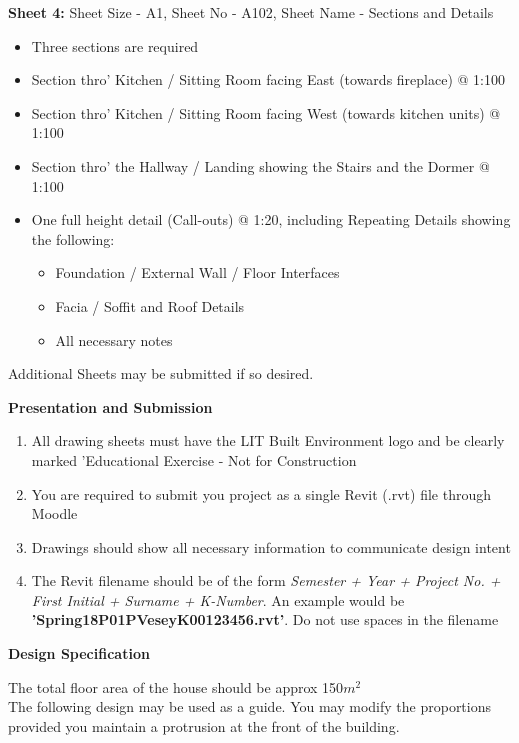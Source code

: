 \textbf{Sheet 4:} Sheet Size - A1, Sheet No - A102, Sheet Name - Sections and Details
\begin{itemize}
	\item Three sections are required
	\item Section thro' Kitchen / Sitting Room facing East (towards fireplace) @ 1:100
	\item Section thro' Kitchen / Sitting Room facing West (towards kitchen units) @ 1:100
	\item Section thro' the Hallway / Landing showing the Stairs and the Dormer @ 1:100
	\item One full height detail (Call-outs) @ 1:20, including Repeating Details showing the following:
	\begin{itemize}
		\item Foundation / External Wall / Floor Interfaces
		\item Facia / Soffit and Roof Details
		\item All necessary notes
	\end{itemize} 
\end{itemize}

Additional Sheets may be submitted if so desired.

\large\textbf{Presentation and Submission}\\
\begin{enumerate}
	\item All drawing sheets must have the LIT Built Environment logo and be clearly marked 'Educational Exercise - Not for Construction
	\item You are required to submit you project as a single Revit (.rvt) file through Moodle
	\item Drawings should show all necessary information to communicate design intent
	\item The Revit filename should be of the form \textit{Semester  + Year + Project No. + First Initial + Surname + K-Number}. An example would be \textbf{'Spring18P01PVeseyK00123456.rvt'}.  Do not use spaces in the filename
\end{enumerate}


\newpage
\begin{flushleft}
\Large\textbf{Design Specification}\\
\end{flushleft}


The total floor area of the house should be approx 150$m^2$\\

The following design may be used as a guide.  You may modify the proportions provided you maintain a protrusion at the front of the building.


